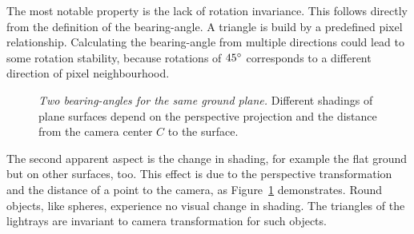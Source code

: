 The most notable property is the lack of rotation invariance.
This follows directly from the definition of the \gls{bearing-angle}.
A triangle is build by a predefined pixel relationship.
Calculating the \gls{bearing-angle} from multiple directions could lead to some rotation stability, because rotations of $45\degree$ corresponds to a different direction of pixel neighbourhood.
\begin{figure}[H]
    \centering
    \caption[Two \glspl{bearing-angle} for the same ground plane]{\emph{Two \glspl{bearing-angle} for the same ground plane.} Different shadings of plane surfaces depend on the perspective projection and the distance from the camera center $C$ to the surface.}\label{fig:bearing_angle_shading}
\end{figure}
The second apparent aspect is the change in shading, for example the flat ground but on other surfaces, too.
This effect is due to the perspective transformation and the distance of a point to the camera, as Figure~\ref{fig:bearing_angle_shading} demonstrates.
Round objects, like spheres, experience no visual change in shading.
The triangles of the lightrays are invariant to camera transformation for such objects.
